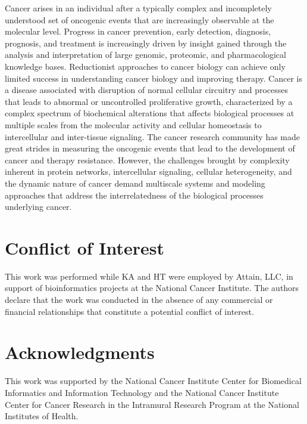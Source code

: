 \documentclass{article}
\begin{document}
Cancer arises in an individual after a typically complex and
incompletely understood set of oncogenic events that are increasingly
observable at the molecular level. Progress in cancer prevention,
early detection, diagnosis, prognosis, and treatment is increasingly
driven by insight gained through the analysis and interpretation of
large genomic, proteomic, and pharmacological knowledge
bases. Reductionist approaches to cancer biology can achieve only
limited success in understanding cancer biology and improving
therapy. Cancer is a disease associated with disruption of normal
cellular circuitry and processes that leads to abnormal or
uncontrolled proliferative growth, characterized by a complex spectrum
of biochemical alterations that affects biological processes at
multiple scales from the molecular activity and cellular homeostasis
to intercellular and inter-tissue signaling. The cancer research
community has made great strides in measuring the oncogenic events
that lead to the development of cancer and therapy
resistance. However, the challenges brought by complexity inherent in
protein networks, intercellular signaling, cellular heterogeneity, and
the dynamic nature of cancer demand multiscale systems and modeling
approaches that address the interrelatedness of the biological
processes underlying cancer.

\section{Conflict of Interest}

This work was performed while KA and HT were employed by Attain, LLC,
in support of bioinformatics projects at the National Cancer
Institute. The authors declare that the work was conducted in the
absence of any commercial or financial relationships that constitute a
potential conflict of interest.

\section{Acknowledgments}
This work was supported by the National Cancer Institute Center for
Biomedical Informatics and Information Technology and the National
Cancer Institute Center for Cancer Research in the Intramural Research
Program at the National Institutes of Health. 

\printbibliography
\end{document}
